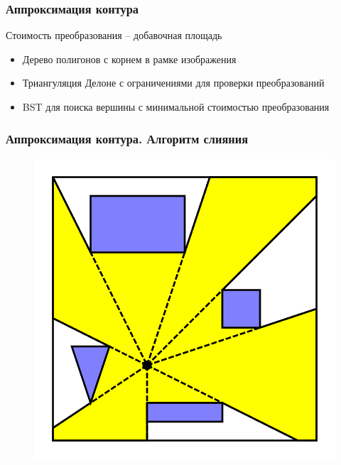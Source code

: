 \documentclass[10pt, unicode]{beamer}
\begin{document}
    \begin{frame}
        \frametitle{Аппроксимация контура}
        Стоимость преобразования -- добавочная площадь
        \begin{itemize}
            \item Дерево полигонов с корнем в рамке изображения
            \item Триангуляция Делоне с ограничениями для проверки преобразований
            \item BST для поиска вершины с минимальной стоимостью преобразования
        \end{itemize}
    \end{frame}
    \begin{frame}
        \frametitle{Аппроксимация контура. Алгоритм слияния}
        \begin{figure}[H]
            \centering
            \includegraphics[scale=0.3]{visibility_polygon.png}
        \end{figure}
    \end{frame}
\end{document}
